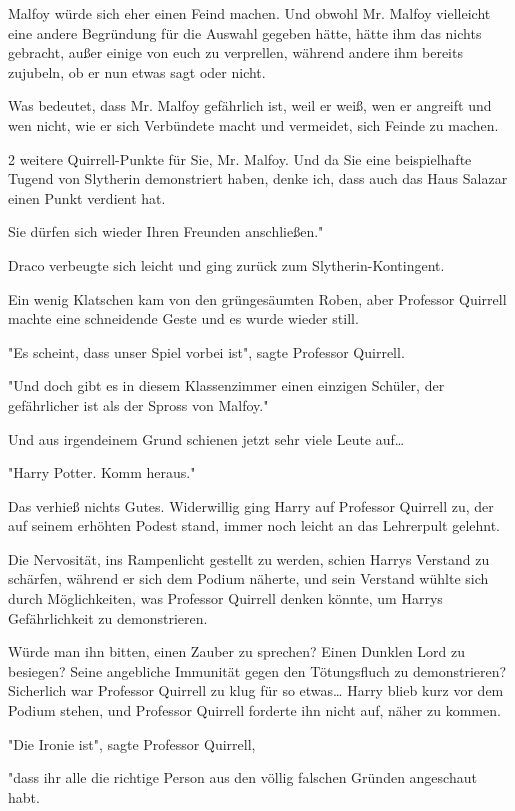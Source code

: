 {Malfoy würde sich eher einen Feind machen. Und obwohl Mr. Malfoy vielleicht eine andere Begründung für die Auswahl gegeben hätte, hätte ihm das nichts gebracht, außer einige von euch zu verprellen, während andere ihm bereits zujubeln, ob er nun etwas sagt oder nicht.

Was bedeutet, dass Mr. Malfoy gefährlich ist, weil er weiß, wen er angreift und wen nicht, wie er sich Verbündete macht und vermeidet, sich Feinde zu machen.

2 weitere Quirrell-Punkte für Sie, Mr. Malfoy. Und da Sie eine beispielhafte Tugend von Slytherin demonstriert haben, denke ich, dass auch das Haus Salazar einen Punkt verdient hat.

Sie dürfen sich wieder Ihren Freunden anschließen."

Draco verbeugte sich leicht und ging zurück zum Slytherin-Kontingent.

Ein wenig Klatschen kam von den grüngesäumten Roben, aber Professor Quirrell machte eine schneidende Geste und es wurde wieder still.

"Es scheint, dass unser Spiel vorbei ist", sagte Professor Quirrell.

"Und doch gibt es in diesem Klassenzimmer einen einzigen Schüler, der gefährlicher ist als der Spross von Malfoy."

Und aus irgendeinem Grund schienen jetzt sehr viele Leute auf…

"Harry Potter. Komm heraus."

Das verhieß nichts Gutes. Widerwillig ging Harry auf Professor Quirrell zu, der auf seinem erhöhten Podest stand, immer noch leicht an das Lehrerpult gelehnt.

Die Nervosität, ins Rampenlicht gestellt zu werden, schien Harrys Verstand zu schärfen, während er sich dem Podium näherte, und sein Verstand wühlte sich durch Möglichkeiten, was Professor Quirrell denken könnte, um Harrys Gefährlichkeit zu demonstrieren.

Würde man ihn bitten, einen Zauber zu sprechen? Einen Dunklen Lord zu besiegen? Seine angebliche Immunität gegen den Tötungsfluch zu demonstrieren? Sicherlich war Professor Quirrell zu klug für so etwas… Harry blieb kurz vor dem Podium stehen, und Professor Quirrell forderte ihn nicht auf, näher zu kommen.

"Die Ironie ist", sagte Professor Quirrell,

"dass ihr alle die richtige Person aus den völlig falschen Gründen angeschaut habt.

}
